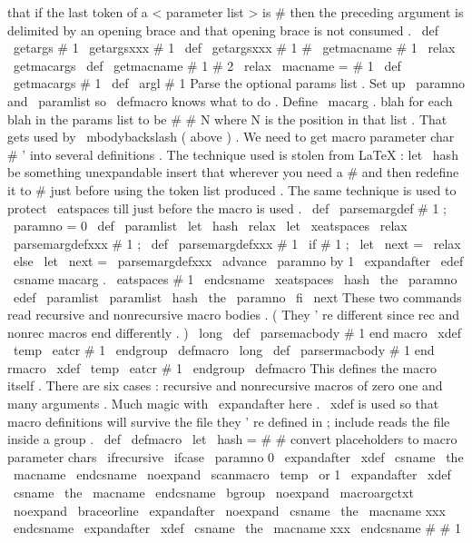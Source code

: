 {{that
if
the
last
token
of
a
%
<
parameter
list
>
is
#
then
the
preceding
argument
is
delimited
by
%
an
opening
brace
and
that
opening
brace
is
not
consumed
.
\
def
\
getargs
#
1
{
\
getargsxxx
#
1
{
}
}
\
def
\
getargsxxx
#
1
#
{
\
getmacname
#
1
\
relax
\
getmacargs
}
\
def
\
getmacname
#
1
#
2
\
relax
{
\
macname
=
{
#
1
}
}
\
def
\
getmacargs
#
1
{
\
def
\
argl
{
#
1
}
}
%
Parse
the
optional
{
params
}
list
.
Set
up
\
paramno
and
\
paramlist
%
so
\
defmacro
knows
what
to
do
.
Define
\
macarg
.
blah
for
each
blah
%
in
the
params
list
to
be
#
#
N
where
N
is
the
position
in
that
list
.
%
That
gets
used
by
\
mbodybackslash
(
above
)
.
%
We
need
to
get
macro
parameter
char
#
'
into
several
definitions
.
%
The
technique
used
is
stolen
from
LaTeX
:
let
\
hash
be
something
%
unexpandable
insert
that
wherever
you
need
a
#
and
then
redefine
%
it
to
#
just
before
using
the
token
list
produced
.
%
%
The
same
technique
is
used
to
protect
\
eatspaces
till
just
before
%
the
macro
is
used
.
\
def
\
parsemargdef
#
1
;
{
\
paramno
=
0
\
def
\
paramlist
{
}
%
\
let
\
hash
\
relax
\
let
\
xeatspaces
\
relax
\
parsemargdefxxx
#
1
;
}
\
def
\
parsemargdefxxx
#
1
{
%
\
if
#
1
;
\
let
\
next
=
\
relax
\
else
\
let
\
next
=
\
parsemargdefxxx
\
advance
\
paramno
by
1
%
\
expandafter
\
edef
\
csname
macarg
.
\
eatspaces
{
#
1
}
\
endcsname
{
\
xeatspaces
{
\
hash
\
the
\
paramno
}
}
%
\
edef
\
paramlist
{
\
paramlist
\
hash
\
the
\
paramno
}
%
\
fi
\
next
}
%
These
two
commands
read
recursive
and
nonrecursive
macro
bodies
.
%
(
They
'
re
different
since
rec
and
nonrec
macros
end
differently
.
)
\
long
\
def
\
parsemacbody
#
1
end
macro
%
{
\
xdef
\
temp
{
\
eatcr
{
#
1
}
}
\
endgroup
\
defmacro
}
%
\
long
\
def
\
parsermacbody
#
1
end
rmacro
%
{
\
xdef
\
temp
{
\
eatcr
{
#
1
}
}
\
endgroup
\
defmacro
}
%
%
This
defines
the
macro
itself
.
There
are
six
cases
:
recursive
and
%
nonrecursive
macros
of
zero
one
and
many
arguments
.
%
Much
magic
with
\
expandafter
here
.
%
\
xdef
is
used
so
that
macro
definitions
will
survive
the
file
%
they
'
re
defined
in
;
include
reads
the
file
inside
a
group
.
\
def
\
defmacro
{
%
\
let
\
hash
=
#
#
%
convert
placeholders
to
macro
parameter
chars
\
ifrecursive
\
ifcase
\
paramno
%
0
\
expandafter
\
xdef
\
csname
\
the
\
macname
\
endcsname
{
%
\
noexpand
\
scanmacro
{
\
temp
}
}
%
\
or
%
1
\
expandafter
\
xdef
\
csname
\
the
\
macname
\
endcsname
{
%
\
bgroup
\
noexpand
\
macroargctxt
\
noexpand
\
braceorline
\
expandafter
\
noexpand
\
csname
\
the
\
macname
xxx
\
endcsname
}
%
\
expandafter
\
xdef
\
csname
\
the
\
macname
xxx
\
endcsname
#
#
1
}}}
